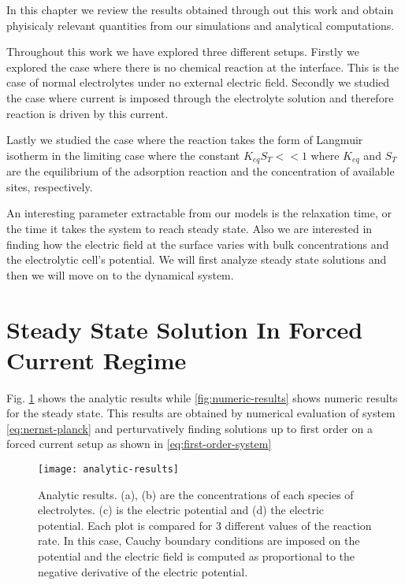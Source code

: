In this chapter we review the results obtained through out this work and obtain phyisicaly relevant quantities from our simulations and analytical computations. 

Throughout this work we have explored three different setups. Firstly we explored the case where there is no chemical reaction at the interface. This is the case of normal electrolytes under no external electric field. Secondly we studied the case where current is imposed through the electrolyte solution and therefore reaction is driven by this current. 

Lastly we studied the case where the reaction takes the form of Langmuir isotherm in the limiting case where the constant $K_{eq}S_T << 1$ where $K_{eq}$ and $S_T$ are the equilibrium of the adsorption reaction and the concentration of available sites, respectively. 

An interesting parameter extractable from our models is the relaxation time, or the time it takes the system to reach steady state. Also we are interested in finding how the electric field at the surface varies with bulk concentrations and the electrolytic cell's potential.  We will first analyze steady state solutions and then we will move on to the dynamical system.



\section{Steady State Solution In Forced Current Regime}

Fig. \ref{fig:analytic-results} shows the analytic results while \ref{fig:numeric-results} shows numeric results for the steady state. This results are obtained by numerical evaluation of system \ref{eq:nernst-planck} and perturvatively finding solutions up to first order on a forced current setup as shown in \ref{eq:first-order-system}

\begin{figure}[h!]
 \centering
 \texttt{[image: analytic-results]}
 \caption{Analytic results. (a), (b) are the concentrations of each species of electrolytes. (c) is the electric potential and (d) the electric potential. Each plot is compared for 3 different values of the reaction rate. In this case, Cauchy boundary conditions are imposed on the potential and the electric field is computed as proportional to the negative derivative of the electric potential.}
 \label{fig:analytic-results}
\end{figure}


